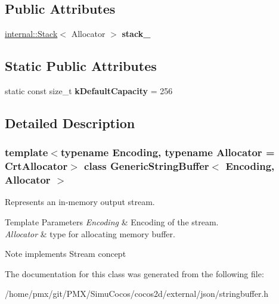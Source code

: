 \subsection*{Public Attributes}
\begin{DoxyCompactItemize}
\item 
\mbox{\label{classGenericStringBuffer_ae3e087cd486715af2671d48f18985f4f}} 
\hyperlink{classinternal_1_1Stack}{internal\+::\+Stack}$<$ Allocator $>$ {\bfseries stack\+\_\+}
\end{DoxyCompactItemize}
\subsection*{Static Public Attributes}
\begin{DoxyCompactItemize}
\item 
\mbox{\label{classGenericStringBuffer_a930fbe5253870ecf919d2b909c9d679c}} 
static const size\+\_\+t {\bfseries k\+Default\+Capacity} = 256
\end{DoxyCompactItemize}


\subsection{Detailed Description}
\subsubsection*{template$<$typename Encoding, typename Allocator = Crt\+Allocator$>$\newline
class Generic\+String\+Buffer$<$ Encoding, Allocator $>$}

Represents an in-\/memory output stream. 


\begin{DoxyTemplParams}{Template Parameters}
{\em Encoding} & Encoding of the stream. \\
\hline
{\em Allocator} & type for allocating memory buffer. \\
\hline
\end{DoxyTemplParams}
\begin{DoxyNote}{Note}
implements Stream concept 
\end{DoxyNote}


The documentation for this class was generated from the following file\+:\begin{DoxyCompactItemize}
\item 
/home/pmx/git/\+P\+M\+X/\+Simu\+Cocos/cocos2d/external/json/stringbuffer.\+h\end{DoxyCompactItemize}
